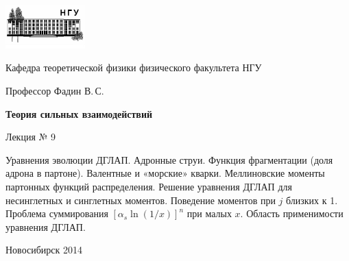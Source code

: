 \documentclass[12pt,pagesize,paper=192mm:108mm]{scrbook}
\begin{document}
\begin{titlepage}
  \vspace*{-1em}
  \begin{center}
    \includegraphics[width=0.23\textwidth]{../NSU-logo}

    Кафедра теоретической физики физического факультета НГУ
    \medskip

    \Large
    Профессор Фадин В.\,С.

    \huge
    \textbf{Теория сильных взаимодействий}
    \smallskip
    
    \Large
    Лекция № 9
    \vfill
    
    \normalsize
    \begin{minipage}{0.8\linewidth}
      Уравнения эволюции ДГЛАП. Адронные струи. Функция фрагментации
      (доля адрона в партоне). Валентные и «морские»
      кварки. Меллиновские моменты партонных функций
      распределения. Решение уравнения ДГЛАП для несинглетных и
      синглетных моментов. Поведение моментов при $j$ близких к
      1. Проблема суммирования $\left[\alpha_s\ln(1/x)\right]^n$ при
      малых $x$. Область применимости уравнения ДГЛАП.
    \end{minipage}
    \vfill
    
    \normalsize \ccbysa\hspace{0.5em} Новосибирск 2014   
  \end{center}
\end{titlepage}
\end{document}
